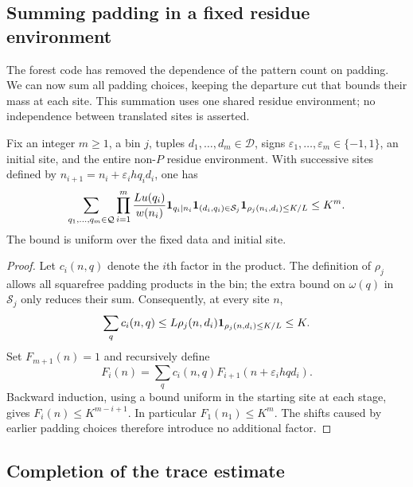 \subsection{Summing padding in a fixed residue environment}

The forest code has removed the dependence of the pattern count on
padding.  We can now sum all padding choices, keeping the departure
cut that bounds their mass at each site.  This summation uses one
shared residue environment; no independence between translated sites
is asserted.

\begin{lemma}\label{q:padding-sum}
Fix an integer $m\ge1$, a bin $j$, tuples
$d_1,\ldots,d_m\in\mathcal D$, signs
$\varepsilon_1,\ldots,\varepsilon_m\in\{-1,1\}$, an initial site, and the entire
non-$P$ residue environment.  With successive sites defined by
$n_{i+1}=n_i+\varepsilon_i hq_i d_i$, one has
\begin{equation}\label{q:padding-product}
 \sum_{q_1,\ldots,q_m\in\mathcal Q}
 \prod_{i=1}^m
 \frac{Lu(q_i)}{w(n_i)}\mathbf 1_{q_i\mid n_i}
 \mathbf 1_{(d_i,q_i)\in\mathcal S_j}
 \mathbf 1_{\rho_j(n_i,d_i)\le K/L}
 \le K^m.
\end{equation}
The bound is uniform over the fixed data and initial site.
\end{lemma}

\begin{proof}
Let $c_i(n,q)$ denote the $i$th factor in the product.  The definition
of $\rho_j$ allows all squarefree padding products in the bin; the
extra bound on $\omega(q)$ in $\mathcal S_j$ only reduces their sum.
Consequently, at every site $n$,
\[
 \sum_q c_i(n,q)
 \le L\rho_j(n,d_i)\mathbf 1_{\rho_j(n,d_i)\le K/L}\le K.
\]
Set $F_{m+1}(n)=1$ and recursively define
\[
 F_i(n)=\sum_q c_i(n,q)
             F_{i+1}(n+\varepsilon_i hqd_i).
\]
Backward induction, using a bound uniform in the starting site at
each stage, gives $F_i(n)\le K^{m-i+1}$.  In particular
$F_1(n_1)\le K^m$.  The shifts caused by earlier padding choices
therefore introduce no additional factor.
\end{proof}

\subsection{Completion of the trace estimate}\label{q:trace-completion}

